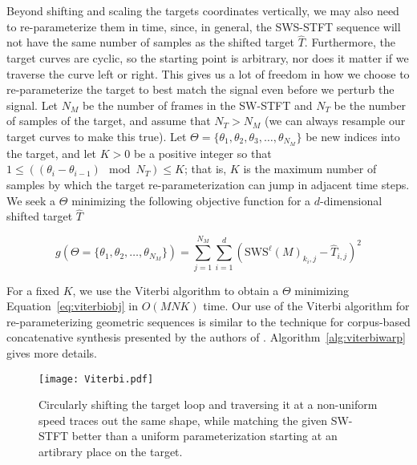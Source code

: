 \documentclass[runningheads]{llncs}
\begin{document}
Beyond shifting and scaling the targets coordinates vertically, we may also need to re-parameterize them in time, since, in general, the SWS-STFT sequence will not have the same number of samples as the shifted target $\hat{T}$.  Furthermore, the target curves are cyclic, so the starting point is arbitrary, nor does it matter if we traverse the curve left or right.  This gives us a lot of freedom in how we choose to re-parameterize the target to best match the signal even before we perturb the signal.  Let $N_M$ be the number of frames in the SW-STFT and $N_T$ be the number of samples of the target, and assume that $N_T > N_M$ (we can always resample our target curves to make this true).  Let $\Theta = \{ \theta_1, \theta_2, \theta_3, \hdots, \theta_{N_M} \}$ be new indices into the target, and let $K > 0$ be a positive integer so that $1 \leq \left( (\theta_i - \theta_{i-1}) \mod N_T \right) \leq K$; that is, $K$ is the maximum number of samples by which the target re-parameterization can jump in adjacent time steps.  We seek a $\Theta$ minimizing the following objective function for a $d$-dimensional shifted target $\hat{T}$

\begin{equation}
  \label{eq:viterbiobj}
  g(\Theta = \{\theta_1, \theta_2, \hdots, \theta_{N_M}\}) = \sum_{j = 1}^{N_M} \sum_{i=1}^d \left( \text{SWS}^{\ell} (M)_{k_i, j} - \hat{T}_{i, j}  \right)^2
\end{equation}

For a fixed $K$, we use the Viterbi algorithm to obtain a $\Theta$ minimizing Equation~\ref{eq:viterbiobj} in $O(MNK)$ time.  Our use of the Viterbi algorithm for re-parameterizing geometric sequences is similar to the technique for corpus-based concatenative synthesis presented by the authors of \cite{schwarz2007corpus}.  Algorithm~\ref{alg:viterbiwarp} gives more details.  

\begin{figure}
  \centering
  \texttt{[image: Viterbi.pdf]}
  \caption{Circularly shifting the target loop and traversing it at a non-uniform speed traces out the same shape, while matching the given SW-STFT better than a uniform parameterization starting at an artibrary place on the target.}
  \label{fig:ViterbiWarp}
\end{figure}
\end{document}
